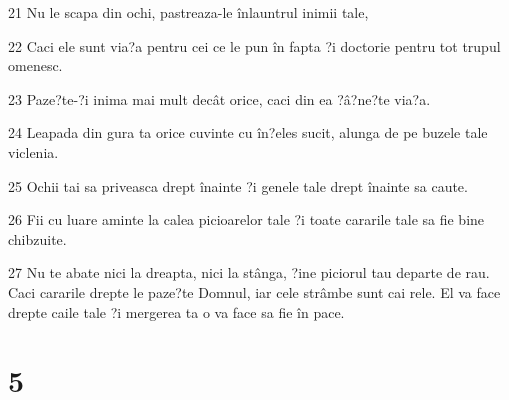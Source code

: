 \par 21 Nu le scapa din ochi, pastreaza-le înlauntrul inimii tale,
\par 22 Caci ele sunt via?a pentru cei ce le pun în fapta ?i doctorie pentru tot trupul omenesc.
\par 23 Paze?te-?i inima mai mult decât orice, caci din ea ?â?ne?te via?a.
\par 24 Leapada din gura ta orice cuvinte cu în?eles sucit, alunga de pe buzele tale viclenia.
\par 25 Ochii tai sa priveasca drept înainte ?i genele tale drept înainte sa caute.
\par 26 Fii cu luare aminte la calea picioarelor tale ?i toate cararile tale sa fie bine chibzuite.
\par 27 Nu te abate nici la dreapta, nici la stânga, ?ine piciorul tau departe de rau. Caci cararile drepte le paze?te Domnul, iar cele strâmbe sunt cai rele. El va face drepte caile tale ?i mergerea ta o va face sa fie în pace.

\chapter{5}

